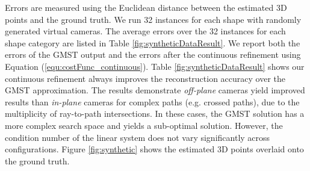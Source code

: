 Errors are measured using the Euclidean distance between the estimated 3D points and the ground truth. We run 32 instances for each shape with randomly generated virtual cameras.
The average errors over the 32 instances for each shape category are listed in Table \ref{fig:syntheticDataResult}. We report both the errors of the GMST output and the errors after the continuous refinement using Equation (\ref{equ:costFunc_continuous}).  Table \ref{fig:syntheticDataResult} shows our  continuous refinement always improves the reconstruction accuracy over the GMST approximation.  The results demonstrate    {\it off-plane} cameras yield improved results than {\it in-plane}  cameras  for  complex paths (e.g. crossed paths), due to the multiplicity of ray-to-path intersections. In these cases, the GMST solution has a more complex search space and yields a sub-optimal solution. However, the condition number of the linear system does not vary significantly across configurations. Figure \ref{fig:synthetic} shows the estimated 3D points overlaid onto the ground truth.

